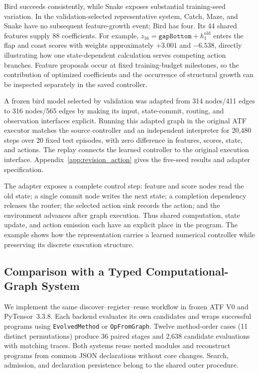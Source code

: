 Bird succeeds consistently, while Snake exposes substantial training-seed variation. In the validation-selected representative system, Catch, Maze, and Snake have no subsequent feature-growth event; Bird has four. Its 44 shared features supply 88 coefficients. For example, $z_{16}=\texttt{gapBottom}+h^{\mathrm{old}}_1$ enters the flap and coast scores with weights approximately $+3.001$ and $-6.538$, directly illustrating how one state-dependent calculation serves competing action branches. Feature proposals occur at fixed training-budget milestones, so the contribution of optimized coefficients and the occurrence of structural growth can be inspected separately in the saved controller.

A frozen bird model selected by validation was adapted from 314 nodes/411 edges to 316 nodes/565 edges by making its input, state-commit, routing, and observation interfaces explicit. Running this adapted graph in the original ATF executor matches the source controller and an independent interpreter for 20,480 steps over 20 fixed test episodes, with zero difference in features, scores, state, and actions. The replay connects the learned controller to the original execution interface. Appendix~\ref{app:revision_action} gives the five-seed results and adapter specification.

The adapter exposes a complete control step: feature and score nodes read the old state; a single commit node writes the next state; a completion dependency releases the router; the selected action sink records the action; and the environment advances after graph execution. Thus shared computation, state update, and action emission each have an explicit place in the program. The example shows how the representation carries a learned numerical controller while preserving its discrete execution structure.

\subsection{Comparison with a Typed Computational-Graph System}
\label{subsec:typed_graph_comparison}
We implement the same discover--register--reuse workflow in frozen ATF V0 and PyTensor~3.3.8. Each backend evaluates its own candidates and wraps successful programs using \texttt{EvolvedMethod} or \texttt{OpFromGraph}. Twelve method-order cases (11 distinct permutations) produce 36 paired stages and 2,638 candidate evaluations with matching traces. Both systems reuse nested modules and reconstruct programs from common JSON declarations without core changes. Search, admission, and declaration persistence belong to the shared outer procedure.

